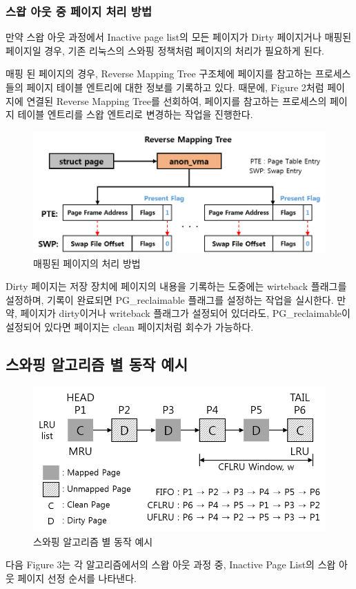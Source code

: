 \documentclass[letterpaper,twocolumn,10pt]{article}
\begin{document}
\subsubsection{스왑 아웃 중 페이지 처리 방법}
만약 스왑 아웃 과정에서 Inactive page list의 모든 페이지가 Dirty 페이지거나 매핑된 페이지일 경우, 기존 리눅스의 스와핑 정책처럼 페이지의 처리가 필요하게 된다. 

매핑 된 페이지의 경우, Reverse Mapping Tree 구조체에 페이지를 참고하는 프로세스들의 페이지 테이블 엔트리에 대한 정보를 기록하고 있다. 때문에, Figure 2처럼 페이지에 연결된 Reverse Mapping Tree를 선회하여, 페이지를 참고하는 프로세스의 페이지 테이블 엔트리를 스왑 엔트리로 변경하는 작업을 진행한다. 

\begin{figure}[h]
\begin{center}
\includegraphics[scale=0.55]{fig2.png}
\end{center}
\caption{매핑된 페이지의 처리 방법}
\end{figure}

Dirty 페이지는 저장 장치에 페이지의 내용을 기록하는 도중에는 wirteback 플래그를 설정하며, 기록이 완료되면 PG\_reclaimable 플래그를 설정하는 작업을 실시한다. 만약, 페이지가 dirty이거나 writeback 플래그가 설정되어 있더라도, PG\_reclaimable이 설정되어 있다면 페이지는 clean 페이지처럼 회수가 가능하다. 

\subsection{스와핑 알고리즘 별 동작 예시}
\begin{figure}[h]
\begin{center}
\includegraphics[scale=0.6]{fig3.png}
\end{center}
\caption{스와핑 알고리즘 별 동작 예시} 
\end{figure}
다음 Figure 3는 각 알고리즘에서의 스왑 아웃 과정 중, Inactive Page List의 스왑 아웃 페이지 선정 순서를 나타낸다.
\end{document}
